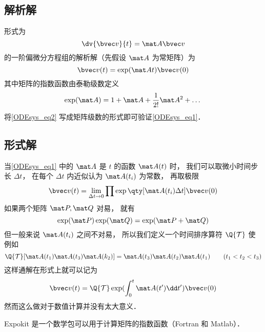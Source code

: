 

\subsection{解析解}
形式为
\begin{equation}\label{ODEsys_eq1}
\dv{\bvec v}{t} = \mat A \bvec v
\end{equation}
的一阶偏微分方程组的解析解（先假设 $\mat A$ 为常矩阵）为
\begin{equation}\label{ODEsys_eq2}
\bvec v(t) = \exp(\mat At) \bvec v(0)
\end{equation}
其中矩阵的指数函数由泰勒级数定义
\begin{equation}
\exp(\mat A) = 1 + \mat A + \frac1{2!} \mat A^2 + \dots
\end{equation}
将\autoref{ODEsys_eq2} 写成矩阵级数的形式即可验证\autoref{ODEsys_eq1}．

\subsection{形式解}
当\autoref{ODEsys_eq1} 中的 $\mat A$ 是 $t$ 的函数 $\mat A(t)$ 时， 我们可以取微小时间步长 $\Delta t$， 在每个 $\Delta t$ 内近似认为 $\mat A(t_i)$ 为常数， 再取极限
\begin{equation}
\bvec v(t) = \lim_{\Delta t \to 0} \prod \exp\qty[\mat A(t_i)\Delta t] \bvec v(0)
\end{equation}
如果两个矩阵 $\mat P, \mat Q$ 对易， 就有
\begin{equation}
\exp(\mat P)\exp(\mat Q) = \exp(\mat P + \mat Q)
\end{equation}
但一般来说 $\mat A(t_i)$ 之间不对易， 所以我们定义一个时间排序算符 $\Q{\mathcal T}$ 使例如
\begin{equation}
\Q {\mathcal T} [\mat A(t_1) \mat A(t_3) \mat A(k_2)] = \mat A(t_3) \mat A(t_2) \mat A(t_1) \qquad ( t_1 < t_2 < t_3 )
\end{equation}
这样通解在形式上就可以记为
\begin{equation}\label{ODEsys_eq3}
\bvec v(t) = \Q {\mathcal T} \exp(\int_0^ t \mat A(t')\dd t') \bvec v(0)
\end{equation}
然而这么做对于数值计算并没有太大意义．

Expokit 是一个数学包可以用于计算矩阵的指数函数（Fortran 和 Matlab）．

